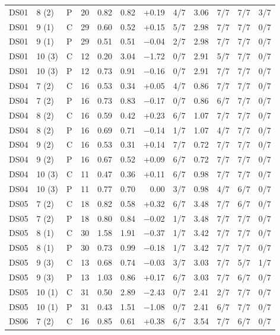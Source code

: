 \documentclass[10pt]{article}
\begin{document}
{\begin{longtable}{lllrrrrrrrrr}
DS01 & 8 (2) & P & 20 & 0.82 & 0.82 & +0.19 & 4/7 & 3.06 & 7/7 & 7/7 & 3/7 \\
DS01 & 9 (1) & C & 29 & 0.60 & 0.52 & +0.15 & 5/7 & 2.98 & 7/7 & 7/7 & 0/7 \\
DS01 & 9 (1) & P & 29 & 0.51 & 0.51 & −0.04 & 2/7 & 2.98 & 7/7 & 7/7 & 0/7 \\
DS01 & 10 (3) & C & 12 & 0.20 & 3.04 & −1.72 & 0/7 & 2.91 & 5/7 & 7/7 & 0/7 \\
DS01 & 10 (3) & P & 12 & 0.73 & 0.91 & −0.16 & 0/7 & 2.91 & 7/7 & 7/7 & 0/7 \\
\midrule
DS04 & 7 (2) & C & 16 & 0.53 & 0.34 & +0.05 & 4/7 & 0.86 & 7/7 & 7/7 & 0/7 \\
DS04 & 7 (2) & P & 16 & 0.73 & 0.83 & −0.17 & 0/7 & 0.86 & 6/7 & 7/7 & 0/7 \\
DS04 & 8 (2) & C & 16 & 0.59 & 0.42 & +0.23 & 6/7 & 1.07 & 7/7 & 7/7 & 0/7 \\
DS04 & 8 (2) & P & 16 & 0.69 & 0.71 & −0.14 & 1/7 & 1.07 & 4/7 & 7/7 & 0/7 \\
DS04 & 9 (2) & C & 16 & 0.53 & 0.31 & +0.14 & 7/7 & 0.72 & 7/7 & 7/7 & 0/7 \\
DS04 & 9 (2) & P & 16 & 0.67 & 0.52 & +0.09 & 6/7 & 0.72 & 7/7 & 7/7 & 0/7 \\
DS04 & 10 (3) & C & 11 & 0.47 & 0.36 & +0.11 & 6/7 & 0.98 & 7/7 & 7/7 & 0/7 \\
DS04 & 10 (3) & P & 11 & 0.77 & 0.70 & 0.00 & 3/7 & 0.98 & 4/7 & 6/7 & 0/7 \\
\midrule
DS05 & 7 (2) & C & 18 & 0.82 & 0.58 & +0.32 & 6/7 & 3.48 & 7/7 & 6/7 & 0/7 \\
DS05 & 7 (2) & P & 18 & 0.80 & 0.84 & −0.02 & 1/7 & 3.48 & 7/7 & 7/7 & 0/7 \\
DS05 & 8 (1) & C & 30 & 1.58 & 1.91 & −0.37 & 1/7 & 3.42 & 7/7 & 7/7 & 0/7 \\
DS05 & 8 (1) & P & 30 & 0.73 & 0.99 & −0.18 & 1/7 & 3.42 & 7/7 & 7/7 & 0/7 \\
DS05 & 9 (3) & C & 13 & 0.68 & 0.74 & −0.03 & 3/7 & 3.03 & 7/7 & 5/7 & 1/7 \\
DS05 & 9 (3) & P & 13 & 1.03 & 0.86 & +0.17 & 6/7 & 3.03 & 7/7 & 6/7 & 0/7 \\
DS05 & 10 (1) & C & 31 & 0.50 & 2.89 & −2.43 & 0/7 & 2.41 & 2/7 & 7/7 & 0/7 \\
DS05 & 10 (1) & P & 31 & 0.43 & 1.51 & −1.08 & 0/7 & 2.41 & 6/7 & 7/7 & 0/7 \\
\midrule
DS06 & 7 (2) & C & 16 & 0.85 & 0.61 & +0.38 & 6/7 & 3.54 & 7/7 & 6/7 & 0/7 \\

\end{longtable}}
\end{document}
